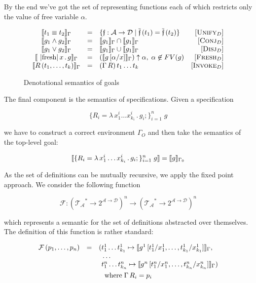 By the end we've got the set of representing functions each of which restricts only the value of free variable $\alpha$. 

\begin{figure}[t]
  \[
  \begin{array}{cclr}
    \sembr{t_1\equiv t_2}_\Gamma&=&\{\mathfrak f : \mathcal{A}\to\mathcal{D}\mid \overline{\mathfrak{f}}\,(t_1)=\overline{\mathfrak{f}}\,(t_2)\}& \mbox{[\textsc{Unify$_D$}]}\\
    \sembr{g_1\wedge g_2}_\Gamma&=&\sembr{g_1}_\Gamma\cap\sembr{g_1}_\Gamma&\mbox{[\textsc{Conj$_D$}]}\\
    \sembr{g_1\vee g_2}_\Gamma&=&\sembr{g_1}_\Gamma\cup\sembr{g_1}_\Gamma&\mbox{[\textsc{Disj$_D$}]}\\
    \sembr{\mbox{\lstinline|fresh|}\,x\,.\,g}_\Gamma&=&(\sembr{g\,[\alpha/x]}_\Gamma)\uparrow\alpha,\;\alpha\not\in FV(g)& \mbox{[\textsc{Fresh$_D$}]}\\
    \sembr{R\,(t_1,\dots,t_k)}_\Gamma&=&(\Gamma\,R)\,t_1\dots t_k & \mbox{[\textsc{Invoke$_D$}]}
  \end{array}
  \]
  \caption{Denotational semantics of goals}
  \label{denotational_semantics_of_goals}
\end{figure}

The final component is the semantics of specifications. Given a specification

\[
\{R_i=\lambda\,x_1^i\dots x_{k_i}^i\,.\,g_i;\}_{i=1}^n\;g
\]

we have to construct a correct environment $\Gamma_O$ and then take the semantics of the top-level goal:

\[
\llbracket{\{R_i=\lambda\,x_1^i\dots x_{k_i}^i\,.\,g_i;\}_{i=1}^n\;g}\rrbracket=\llbracket{g}\rrbracket_{\Gamma_0}
\]

As the set of definitions can be mutually recursive, we apply the fixed point approach. We consider the following
function

\[
\mathcal{F} : (\mathcal{T_A}^*\to 2^{\mathcal{A}\to\mathcal{D}})^n\to (\mathcal{T_A}^*\to 2^{\mathcal{A}\to\mathcal{D}})^n
\]

which represents a semantic for the set of definitions abstracted over themselves. The definition of this function is
rather standard:

\begin{gather*}
    \begin{array}{rcl}
      \mathcal{F}\,(p_1,\dots,p_n)& = &(t^1_1\dots t^1_{k_1}\mapsto\llbracket{g^1\,[t^1_1/x^1_1,\dots,t^1_{k_1}/x^1_{k_1}]}\rrbracket_\Gamma,\\
                                  &  &\phantom{(}\dots\\
                                  &  &\phantom{(}t^n_1\dots t^n_{k_n}\mapsto\llbracket{g^n\,[t^n_1/x^n_1,\dots,t^n_{k_n}/x^n_{k_n}]}\rrbracket_\Gamma)
    \end{array}\\
    \mbox{where}\;\Gamma\, R_i=p_i
\end{gather*}

